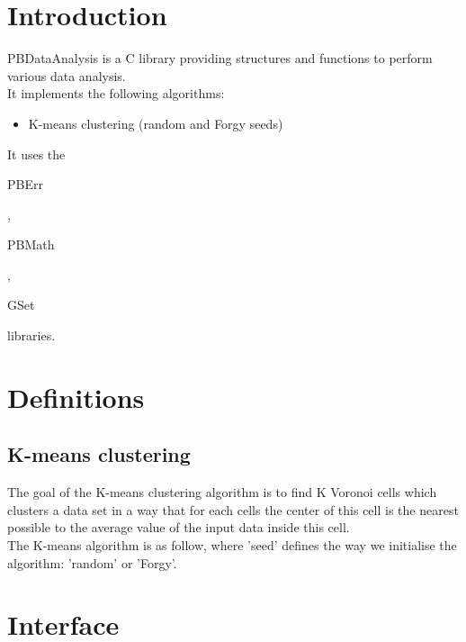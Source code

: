 \section*{Introduction}

PBDataAnalysis is a C library providing structures and functions to perform various data analysis.\\ 

It implements the following algorithms:
\begin{itemize}
\item K-means clustering (random and Forgy seeds)
\end{itemize}

It uses the \begin{ttfamily}PBErr\end{ttfamily}, \begin{ttfamily}PBMath\end{ttfamily}, \begin{ttfamily}GSet\end{ttfamily} libraries.\\

\section{Definitions}

\subsection{K-means clustering}

The goal of the K-means clustering algorithm is to find K Voronoi cells which clusters a data set in a way that for each cells the center of this cell is the nearest possible to the average value of the input data inside this cell.\\

The K-means algorithm is as follow, where 'seed' defines the way we initialise the algorithm: 'random' or 'Forgy'.\\

\begin{scriptsize}
\begin{ttfamily}

\end{ttfamily}
\end{scriptsize}

\section{Interface}

